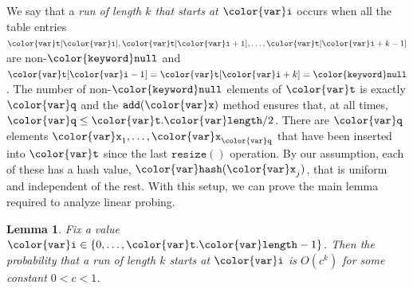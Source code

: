 \documentclass[10pt]{book}
\theoremstyle{plain}
\newtheorem{lem}{Lemma}[chapter]
\newcommand{\lemlabel}[1]{\label{lem:#1}}
\theoremstyle{definition}
\begin{document}
%
We say that a \emph{run of length $k$ that starts at \ensuremath{\mathtt{{\color{var}i}}}} occurs when all
the table entries $\ensuremath{\mathtt{{\color{var}t}[{\color{var}i}]}}, \ensuremath{\mathtt{{\color{var}t}[{\color{var}i}+1]}},\ldots,\ensuremath{\mathtt{{\color{var}t}}}[\ensuremath{\mathtt{{\color{var}i}}}+k-1]$ are non-\ensuremath{\mathtt{{\color{keyword}null}}}
and $\ensuremath{\mathtt{{\color{var}t}}}[\ensuremath{\mathtt{{\color{var}i}}}-1]=\ensuremath{\mathtt{{\color{var}t}}}[\ensuremath{\mathtt{{\color{var}i}}}+k]=\ensuremath{\mathtt{{\color{keyword}null}}}$.  The number of non-\ensuremath{\mathtt{{\color{keyword}null}}} elements of
\ensuremath{\mathtt{{\color{var}t}}} is exactly \ensuremath{\mathtt{{\color{var}q}}} and the \ensuremath{\mathtt{add({\color{var}x})}} method ensures that, at all times,
$\ensuremath{\mathtt{{\color{var}q}}}\le\ensuremath{\mathtt{{\color{var}t}.{\color{var}length}}}/2$.  There are \ensuremath{\mathtt{{\color{var}q}}} elements $\ensuremath{\mathtt{{\color{var}x}}}_1,\ldots,\ensuremath{\mathtt{{\color{var}x}}}_{\ensuremath{\mathtt{{\color{var}q}}}}$
that have been inserted into \ensuremath{\mathtt{{\color{var}t}}} since the last \ensuremath{\mathtt{resize()}} operation.
By our assumption, each of these has a hash value, $\ensuremath{\mathtt{{\color{var}hash}}}(\ensuremath{\mathtt{{\color{var}x}}}_j)$,
that is uniform and independent of the rest.  With this setup, we can
prove the main lemma required to analyze linear probing.

\begin{lem}\lemlabel{linear-probing}
Fix a value $\ensuremath{\mathtt{{\color{var}i}}}\in\{0,\ldots,\ensuremath{\mathtt{{\color{var}t}.{\color{var}length}}}-1\}$.  Then the probability that
a run of length $k$ starts at \ensuremath{\mathtt{{\color{var}i}}} is $O(c^k)$ for some constant $0<c<1$.
\end{lem}
\end{document}
